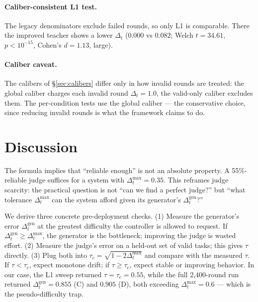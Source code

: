 \documentclass{article}
\begin{document}
\paragraph{Caliber-consistent L1 test.} The legacy denominators exclude failed rounds, so only L1 is
comparable. There the improved teacher shows a lower $\Delta_t$ ($0.000$ vs $0.082$; Welch
$t = 34.61$, $p < 10^{-15}$, Cohen's $d = 1.13$, large).

\paragraph{Caliber caveat.} The calibers of \S\ref{sec:calibers} differ only in how invalid rounds
are treated: the global caliber charges each invalid round $\Delta_t = 1.0$, the valid-only caliber
excludes them. The per-condition tests use the global caliber --- the conservative choice, since
reducing invalid rounds is what the framework claims to do.

\section{Discussion}

The formula implies that ``reliable enough'' is not an absolute property. A 55\%-reliable judge
suffices for a system with $\Delta_t^{\max} = 0.35$. This reframes judge scarcity: the practical
question is not ``can we find a perfect judge?'' but ``what tolerance $\Delta_t^{\max}$ can the
system afford given its generator's $\Delta_t^{\mathrm{gen}}$?''

We derive three concrete pre-deployment checks. (1) Measure the generator's error
$\Delta_t^{\mathrm{gen}}$ at the greatest difficulty the controller is allowed to request. If
$\Delta_t^{\mathrm{gen}} \ge \Delta_t^{\max}$, the generator is the bottleneck; improving the judge is
wasted effort. (2) Measure the judge's error on a held-out set of valid tasks; this gives $\tau$
directly. (3) Plug both into $\tau_c = \sqrt{1 - 2\Delta_t^{\max}}$ and compare with the measured
$\tau$. If $\tau < \tau_c$, expect monotone drift; if $\tau \ge \tau_c$, expect stable or improving
behavior. In our case, the L1 sweep returned $\tau = \tau_c = 0.55$, while the full 2,400-round run
returned $\Delta_t^{\mathrm{gen}} = 0.855$ (C) and $0.905$ (D), both exceeding $\Delta_t^{\max} = 0.6$
--- which is the pseudo-difficulty trap.
\end{document}
